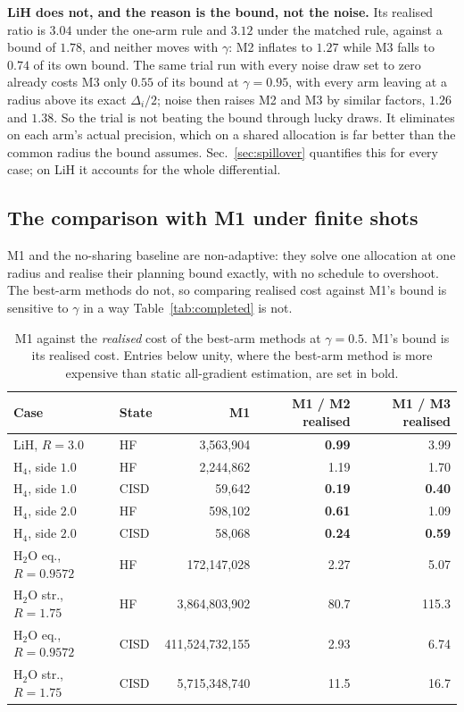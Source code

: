 \documentclass[10pt]{article}
\begin{document}
\textbf{LiH does not, and the reason is the bound, not the noise.} Its realised
ratio is $3.04$ under the one-arm rule and $3.12$ under the matched rule, against a
bound of $1.78$, and neither moves with $\gamma$: M2 inflates to $1.27$ while M3
falls to $0.74$ of its own bound. The same trial run with every noise draw set to
zero already costs M3 only $0.55$ of its bound at $\gamma=0.95$, with every arm
leaving at a radius above its exact $\Delta_i/2$; noise then raises M2 and M3 by
similar factors, $1.26$ and $1.38$. So the
trial is not beating the bound through lucky draws. It eliminates on each arm's
actual precision, which on a shared allocation is far better than the common radius
the bound assumes. Sec.~\ref{sec:spillover} quantifies this for every case; on LiH
it accounts for the whole differential.

\subsection{The comparison with M1 under finite shots}
\label{sec:m1-finite}

M1 and the no-sharing baseline are non-adaptive: they solve one allocation at one
radius and realise their planning bound exactly, with no schedule to overshoot.
The best-arm methods do not, so comparing realised cost against M1's bound is
sensitive to $\gamma$ in a way Table~\ref{tab:completed} is not.

\begin{table}[!htbp]
\centering
\scriptsize
\caption{M1 against the \emph{realised} cost of the best-arm methods at $\gamma=0.5$. M1's bound is its realised cost. Entries below unity, where the best-arm method is more expensive than static all-gradient estimation, are set in bold.}
\label{tab:m1-finite}
\begin{tabular}{llrrr}
\toprule
Case & State & M1 & M1 / M2 realised & M1 / M3 realised \\
\midrule
LiH, $R{=}3.0$ & HF & 3,563,904 & \textbf{0.99} & 3.99 \\
H$_4$, side $1.0$ & HF & 2,244,862 & 1.19 & 1.70 \\
H$_4$, side $1.0$ & CISD & 59,642 & \textbf{0.19} & \textbf{0.40} \\
H$_4$, side $2.0$ & HF & 598,102 & \textbf{0.61} & 1.09 \\
H$_4$, side $2.0$ & CISD & 58,068 & \textbf{0.24} & \textbf{0.59} \\
H$_2$O eq., $R{=}0.9572$ & HF & 172,147,028 & 2.27 & 5.07 \\
H$_2$O str., $R{=}1.75$ & HF & 3,864,803,902 & 80.7 & 115.3 \\
H$_2$O eq., $R{=}0.9572$ & CISD & 411,524,732,155 & 2.93 & 6.74 \\
H$_2$O str., $R{=}1.75$ & CISD & 5,715,348,740 & 11.5 & 16.7 \\
\bottomrule
\end{tabular}
\end{table}
\end{document}
